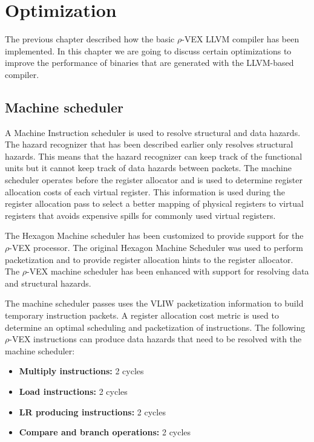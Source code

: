 \chapter{Optimization}
\label{chap:optimization}
The previous chapter described how the basic $\rho$-VEX LLVM compiler has been implemented. In this chapter we are going to discuss certain optimizations to improve the performance of binaries that are generated with the LLVM-based compiler.

\section{Machine scheduler}
A Machine Instruction scheduler is used to resolve structural and data hazards. The hazard recognizer that has been described earlier only resolves structural hazards. This means that the hazard recognizer can keep track of the functional units but it cannot keep track of data hazards between packets. The machine scheduler operates before the register allocator and is used to determine register allocation costs of each virtual register. This information is used during the register allocation pass to select a better mapping of physical registers to virtual registers that avoids expensive spills for commonly used virtual registers.

The Hexagon Machine scheduler has been customized to provide support for the $\rho$-VEX processor. The original Hexagon Machine Scheduler was used to perform packetization and to provide register allocation hints to the register allocator. The $\rho$-VEX machine scheduler has been enhanced with support for resolving data and structural hazards. 

The machine scheduler passes uses the VLIW packetization information to build temporary instruction packets. A register allocation cost metric is used to determine an optimal scheduling and packetization of instructions. The following $\rho$-VEX instructions can produce data hazards that need to be resolved with the machine scheduler:

\begin{itemize}
  \item \textbf{Multiply instructions:} 2 cycles
  \item \textbf{Load instructions:} 2 cycles
  \item \textbf{LR producing instructions:} 2 cycles
  \item \textbf{Compare and branch operations:} 2 cycles
\end{itemize}

